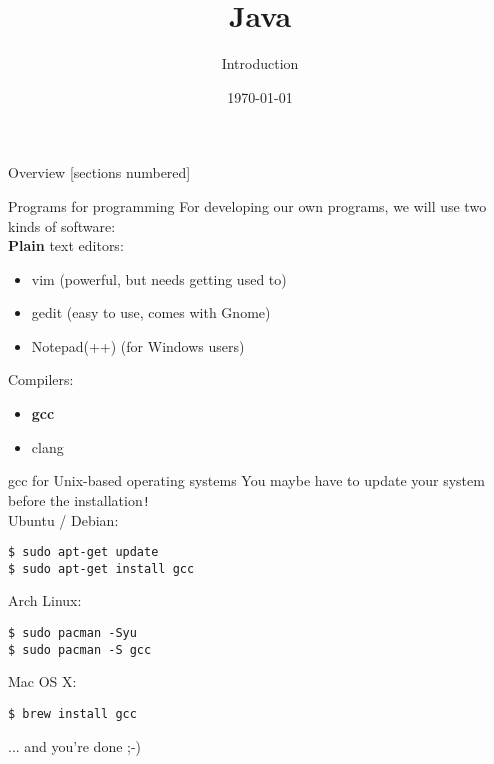 \iffalse\documentclass{article}\fi
\title{Java}
\subtitle{Introduction}
\date{\today}
\begin{document}
\begin{frame}
	\titlepage
\end{frame}
\begin{frame}{Overview}
	[sections numbered]
	\tableofcontents
\end{frame}
\begin{frame}{Programs for programming}
	For developing our own programs, we will use two kinds of software:\\
	\bigskip
	\textbf{Plain} text editors:
	\begin{itemize}
		\item vim (powerful, but needs getting used to)
		\item gedit (easy to use, comes with Gnome)
		\item Notepad(++) (for Windows users)
	\end{itemize}
	\bigskip
	Compilers:
	\begin{itemize}
		\item \textbf{gcc}
		\item clang
	\end{itemize}
\end{frame}

\begin{frame}[fragile ]{gcc for Unix-based operating systems}
	You maybe have to update your system before the installation\verb|!| \\
	Ubuntu / Debian:
	\begin{lstlisting}[numbers=none]
$ sudo apt-get update
$ sudo apt-get install gcc
    \end{lstlisting}
	\bigskip
	Arch Linux:
	\begin{lstlisting}[numbers=none]
$ sudo pacman -Syu
$ sudo pacman -S gcc
    \end{lstlisting}
	\bigskip
	Mac OS X:
	\begin{lstlisting}[numbers=none]
$ brew install gcc
    \end{lstlisting}
	\bigskip
	... and you're done ;-)
\end{frame}
\end{document}

